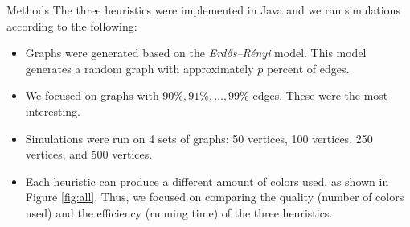 \documentclass[final]{beamer}
\newlength{\twocolwid}
\newlength{\halfcolwid}
\begin{document}
\begin{frame}[t]
\begin{columns}[t]
\begin{column}{\twocolwid}
\begin{columns}
      \begin{column}{\halfcolwid}
        \vspace{-0.7cm}
        \begin{block}{Methods}
          The three heuristics were implemented in Java and we ran simulations according to the following:
          \begin{itemize}
            \setlength\itemsep{0.4em}
            \item Graphs were generated based on the \emph{Erdős–Rényi} model. This model generates a random graph with approximately $p$ percent of edges.
            \item We focused on graphs with $90\%, 91\%, \ldots, 99\%$ edges. These were the most interesting.
            \item Simulations were run on 4 sets of graphs: 50 vertices, 100 vertices, 250 vertices, and 500 vertices.
            \item Each heuristic can produce a different amount of colors used, as shown in Figure \ref{fig:all}. Thus, we focused on comparing the quality (number of colors used) and the efficiency (running time) of the three heuristics.
          \end{itemize}
        \end{block}
      \end{column}
    \end{columns}


\end{column}
\end{columns}
\end{frame}
\end{document}
